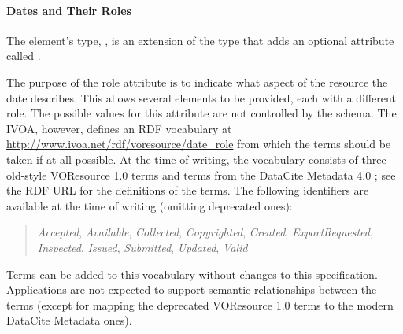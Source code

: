\documentclass[11pt,a4paper]{ivoa}
\begin{document}
\paragraph{Dates and Their Roles}

The  element's type, , is an extension of the
 type that adds an
optional attribute called .

The purpose of the role attribute is to indicate what aspect of the
resource the date describes. This allows several  elements to be
provided, each with a different role. The possible values for this
attribute are not controlled by the schema.  The IVOA, however, defines
an RDF vocabulary at
\url{http://www.ivoa.net/rdf/voresource/date_role} from
which the  terms should be taken if at all possible.  At the
time of writing, the vocabulary consists of three old-style VOResource
1.0 terms and terms from the DataCite Metadata 4.0 \citep{std:DataCite40};
see the RDF URL for
the definitions of the terms.  The following identifiers are available at
the time of writing (omitting deprecated ones):

\begin{quotation}\noindent
\textsl{Accepted},
\textsl{Available},
\textsl{Collected},
\textsl{Copyrighted},
\textsl{Created},
\textsl{ExportRequested},
\textsl{Inspected},
\textsl{Issued},
\textsl{Submitted},
\textsl{Updated},
\textsl{Valid}
\end{quotation}


Terms can be added to this vocabulary without changes to this
specification.  Applications are not expected to support semantic
relationships between the terms (except for mapping the deprecated
VOResource 1.0 terms to the modern DataCite Metadata ones).
\end{document}
